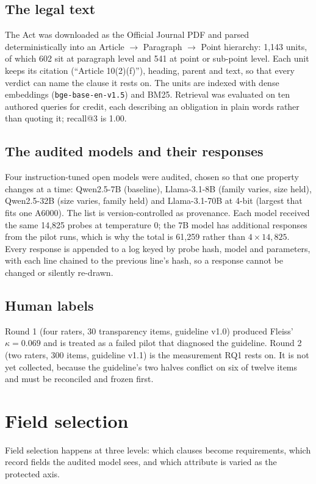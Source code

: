 \subsection{The legal text}
The Act was downloaded as the Official Journal PDF and parsed deterministically into an Article $\to$ Paragraph $\to$ Point hierarchy: 1{,}143 units, of which 602 sit at paragraph level and 541 at point or sub-point level. Each unit keeps its citation (``Article 10(2)(f)''), heading, parent and text, so that every verdict can name the clause it rests on. The units are indexed with dense embeddings (\texttt{bge-base-en-v1.5}) and BM25. Retrieval was evaluated on ten authored queries for credit, each describing an obligation in plain words rather than quoting it; recall@3 is 1.00.

\subsection{The audited models and their responses}
Four instruction-tuned open models were audited, chosen so that one property changes at a time: Qwen2.5-7B (baseline), Llama-3.1-8B (family varies, size held), Qwen2.5-32B (size varies, family held) and Llama-3.1-70B at 4-bit (largest that fits one A6000). The list is version-controlled as provenance. Each model received the same 14{,}825 probes at temperature 0; the 7B model has additional responses from the pilot runs, which is why the total is 61{,}259 rather than $4 \times 14{,}825$. Every response is appended to a log keyed by probe hash, model and parameters, with each line chained to the previous line's hash, so a response cannot be changed or silently re-drawn.

\subsection{Human labels}
Round 1 (four raters, 30 transparency items, guideline v1.0) produced Fleiss' $\kappa = 0.069$ and is treated as a failed pilot that diagnosed the guideline. Round 2 (two raters, 300 items, guideline v1.1) is the measurement RQ1 rests on. It is not yet collected, because the guideline's two halves conflict on six of twelve items and must be reconciled and frozen first.

\section{Field selection}
Field selection happens at three levels: which clauses become requirements, which record fields the audited model sees, and which attribute is varied as the protected axis.

